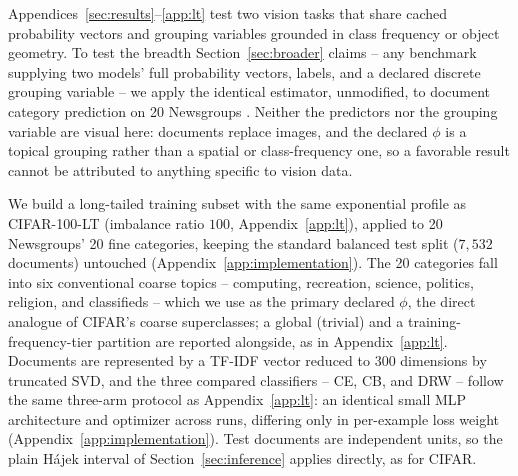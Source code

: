 Appendices~\ref{sec:results}--\ref{app:lt} test two vision tasks that share cached
probability vectors and grouping variables grounded in class frequency or object geometry.
To test the breadth Section~\ref{sec:broader} claims -- any benchmark supplying two
models' full probability vectors, labels, and a declared discrete grouping variable -- we
apply the identical estimator, unmodified, to document category prediction on 20
Newsgroups \citep{lang1995newsweeder}. Neither the predictors nor the grouping variable are
visual here: documents replace images, and the declared $\phi$ is a topical grouping
rather than a spatial or class-frequency one, so a favorable result cannot be attributed
to anything specific to vision data.

We build a long-tailed training subset with the same exponential profile as
CIFAR-100-LT (imbalance ratio $100$, Appendix~\ref{app:lt}), applied to 20
Newsgroups' 20 fine categories, keeping the standard balanced test split ($7{,}532$
documents) untouched (Appendix~\ref{app:implementation}). The 20 categories fall into
six conventional coarse topics -- computing, recreation, science, politics, religion,
and classifieds -- which we use as the primary declared $\phi$, the direct analogue of
CIFAR's coarse superclasses; a global (trivial) and a training-frequency-tier partition
are reported alongside, as in Appendix~\ref{app:lt}. Documents are represented by a
TF-IDF vector reduced to $300$ dimensions by truncated SVD, and the three compared
classifiers -- CE, CB, and DRW -- follow the same three-arm protocol as
Appendix~\ref{app:lt}: an identical small MLP architecture and optimizer across runs,
differing only in per-example loss weight (Appendix~\ref{app:implementation}). Test
documents are independent units, so the plain H\'ajek interval of Section~\ref{sec:inference}
applies directly, as for CIFAR.


